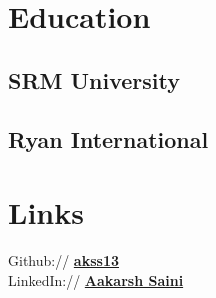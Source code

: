 \documentclass[]{deedy-resume-openfont}
\begin{document}
\begin{minipage}[t][18cm]{0.33\textwidth} 


\section{Education} 

\subsection{SRM University}
\sectionsep

\subsection{Ryan International}
\sectionsep


\section{Links} 
Github:// \href{https://github.com/akss13}{\bf akss13} \\
LinkedIn://  \href{https://www.linkedin.com/in/aakarsh-saini-609a86178/}{\bf Aakarsh Saini} \\




\end{minipage}
\end{document}
